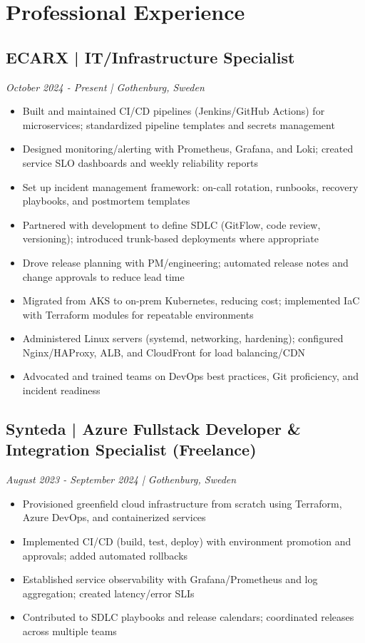 \documentclass[11pt,a4paper]{article}
\begin{document}
\section*{Professional Experience}

\subsection*{ECARX | IT/Infrastructure Specialist}
\textit{October 2024 - Present | Gothenburg, Sweden}
\begin{itemize}[noitemsep]
\item Built and maintained CI/CD pipelines (Jenkins/GitHub Actions) for microservices; standardized pipeline templates and secrets management
\item Designed monitoring/alerting with Prometheus, Grafana, and Loki; created service SLO dashboards and weekly reliability reports
\item Set up incident management framework: on-call rotation, runbooks, recovery playbooks, and postmortem templates
\item Partnered with development to define SDLC (GitFlow, code review, versioning); introduced trunk-based deployments where appropriate
\item Drove release planning with PM/engineering; automated release notes and change approvals to reduce lead time
\item Migrated from AKS to on-prem Kubernetes, reducing cost; implemented IaC with Terraform modules for repeatable environments
\item Administered Linux servers (systemd, networking, hardening); configured Nginx/HAProxy, ALB, and CloudFront for load balancing/CDN
\item Advocated and trained teams on DevOps best practices, Git proficiency, and incident readiness
\end{itemize}

\subsection*{Synteda | Azure Fullstack Developer \& Integration Specialist (Freelance)}
\textit{August 2023 - September 2024 | Gothenburg, Sweden}
\begin{itemize}[noitemsep]
\item Provisioned greenfield cloud infrastructure from scratch using Terraform, Azure DevOps, and containerized services
\item Implemented CI/CD (build, test, deploy) with environment promotion and approvals; added automated rollbacks
\item Established service observability with Grafana/Prometheus and log aggregation; created latency/error SLIs
\item Contributed to SDLC playbooks and release calendars; coordinated releases across multiple teams
\end{itemize}
\end{document}

